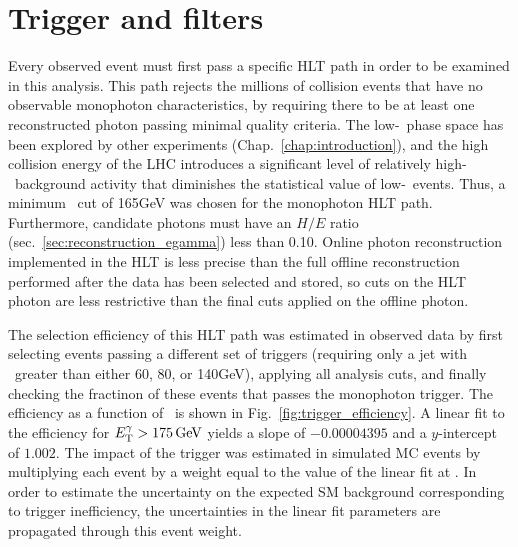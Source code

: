 \section{Trigger and \texorpdfstring{\MET}{pTmiss} filters} \label{sec:event_selection_trigger_METfilters}
Every observed event must first pass a specific HLT path in order to be examined in this analysis. This path rejects the millions of collision events that have no observable
monophoton characteristics, by requiring there to be at least one reconstructed photon passing minimal quality criteria.
The low-\pTgamma\ phase space has been explored by other experiments (Chap.~\ref{chap:introduction}), and the high collision energy of the LHC introduces a significant
level of relatively high-\pT\ background activity that diminishes the statistical value of low-\pTgamma\ events.
Thus, a minimum \ETgamma\ cut of 165\unit{GeV} was chosen for the monophoton HLT path.
Furthermore, candidate photons must have an $H/E$ ratio (sec.~\ref{sec:reconstruction_egamma}) less than 0.10.
Online photon reconstruction implemented in the HLT is less precise than the full offline reconstruction performed after the data has been selected and stored,
so cuts on the HLT photon are less restrictive than the final cuts applied on the offline photon.

The selection efficiency of this HLT path was estimated in observed data by first selecting events passing a different set of triggers (requiring only a jet with \pT\ greater than
either 60, 80, or 140\unit{GeV}), applying all analysis cuts, and finally checking the fractinon of these events that passes the monophoton trigger.
The efficiency as a function of \ETgamma\ is shown in Fig.~\ref{fig:trigger_efficiency}.
A linear fit to the efficiency for $\ETgamma > 175\unit{GeV}$ yields a slope of $-0.00004395$ and a  $y$-intercept of $1.002$. The impact of the trigger was estimated
in simulated MC events by multiplying each event by a weight equal to the value of the linear fit at \ETgamma. In order to estimate the uncertainty on the expected
SM background corresponding to trigger inefficiency, the uncertainties in the linear fit parameters are propagated through this event weight.

